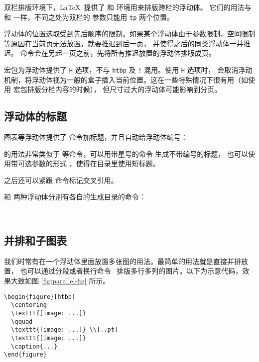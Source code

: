 双栏排版环境下，\LaTeX\ 提供了  和  环境用来排版跨栏的浮动体。
它们的用法与  和  一样，不同之处为双栏的  参数只能用 \texttt{tp} 两个位置。

浮动体的位置选取受到先后顺序的限制。如果某个浮动体由于参数限制、空间限制等原因在当前页无法放置，就要推迟到后一页，
并使得之后的同类浮动体一并推迟。 命令会在另起一页之前，先将所有推迟放置的浮动体排版成页。


 宏包为浮动体提供了 \texttt{H} 选项，不与 \texttt{htbp} 及 \texttt{!} 混用。使用 \texttt{H} 选项时，
会取消浮动机制，将浮动体视为一般的盒子插入当前位置。这在一些特殊情况下很有用（如使用  宏包排版分栏内容的时候），
但尺寸过大的浮动体可能影响到分页。

\subsection{浮动体的标题}\label{subsec:caption}

图表等浮动体提供了  命令加标题，并且自动给浮动体编号：
\begin{command}
\marg*{\ldots}
\end{command}
 的用法非常类似于  等命令，可以用带星号的命令  生成不带编号的标题，
也可以使用带可选参数的形式 \oarg*{\ldots}\marg*{\ldots}，使得在目录里使用短标题。

 之后还可以紧跟  命令标记交叉引用。

 和  两种浮动体分别有各自的生成目录的命令：
\begin{command}
 \\
\end{command}

\subsection{并排和子图表}\label{subsec:subfig}

我们时常有在一个浮动体里面放置多张图的用法。最简单的用法就是直接并排放置，
也可以通过分段或者换行命令 \crcmd\ 排版多行多列的图片。以下为示意代码，效果大致如图 \ref{fig:parallel-fig} 所示。
\begin{verbatim}
\begin{figure}[htbp]
  \centering
  \texttt{[image: ...]}
  \qquad
  \texttt{[image: ...]} \\[..pt]
  \texttt{[image: ...]} 
  \caption{...}
\end{figure}
\end{verbatim}

